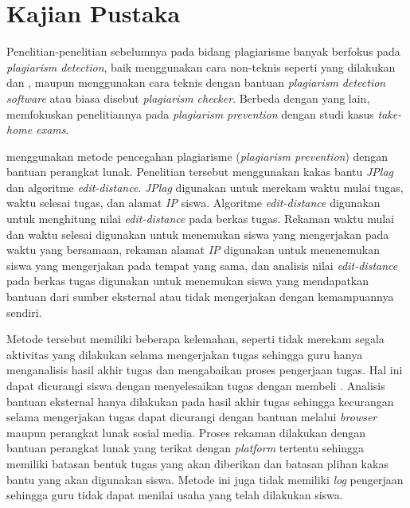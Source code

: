 

\section{Kajian Pustaka}

Penelitian-penelitian sebelumnya pada bidang plagiarisme banyak berfokus
pada \emph{plagiarism detection}, baik menggunakan cara non-teknis
seperti yang dilakukan \textcite{leung2017instructional} dan
\textcite{mclafferty2004electronic}, maupun menggunakan cara teknis
dengan bantuan \emph{plagiarism detection software} atau biasa
disebut \emph{plagiarism checker}. Berbeda dengan yang lain,
\textcite{hellas2017plagiarism} memfokuskan penelitiannya pada
\emph{plagiarism prevention} dengan studi kasus \emph{take-home
  exams}.

\textcite{hellas2017plagiarism} menggunakan metode pencegahan plagiarisme
(\emph{plagiarism prevention}) dengan bantuan perangkat lunak. Penelitian
tersebut menggunakan kakas bantu \emph{JPlag} dan algoritme
\emph{edit-distance}. \emph{JPlag} digunakan untuk merekam waktu mulai tugas,
waktu selesai tugas, dan alamat \emph{IP} siswa. Algoritme
\emph{edit-distance} digunakan untuk menghitung nilai \emph{edit-distance} pada
berkas tugas. Rekaman waktu mulai dan waktu selesai digunakan
untuk menemukan siswa yang mengerjakan pada waktu yang bersamaan,
rekaman alamat \emph{IP} digunakan untuk menenemukan siswa yang
mengerjakan pada tempat yang sama, dan analisis nilai \emph{edit-distance} pada
berkas tugas digunakan untuk menemukan siswa yang
mendapatkan bantuan dari sumber eksternal atau tidak mengerjakan dengan
kemampuannya sendiri.

Metode tersebut memiliki beberapa kelemahan,
seperti tidak merekam segala aktivitas yang dilakukan selama
mengerjakan tugas sehingga guru hanya menganalisis hasil akhir tugas
dan mengabaikan proses pengerjaan tugas. Hal ini dapat dicurangi siswa
dengan menyelesaikan tugas dengan membeli
\parencite{leung2017instructional}. Analisis bantuan eksternal hanya
dilakukan pada hasil akhir tugas sehingga kecurangan selama
mengerjakan tugas dapat dicurangi dengan bantuan melalui
\emph{browser} maupun perangkat lunak sosial media. Proses
rekaman dilakukan dengan bantuan perangkat lunak yang terikat dengan
\emph{platform} tertentu sehingga memiliki batasan bentuk tugas yang
akan diberikan dan batasan plihan kakas bantu yang akan digunakan
siswa. Metode ini juga tidak memiliki \emph{log} pengerjaan sehingga
guru tidak dapat menilai usaha yang telah dilakukan siswa.

